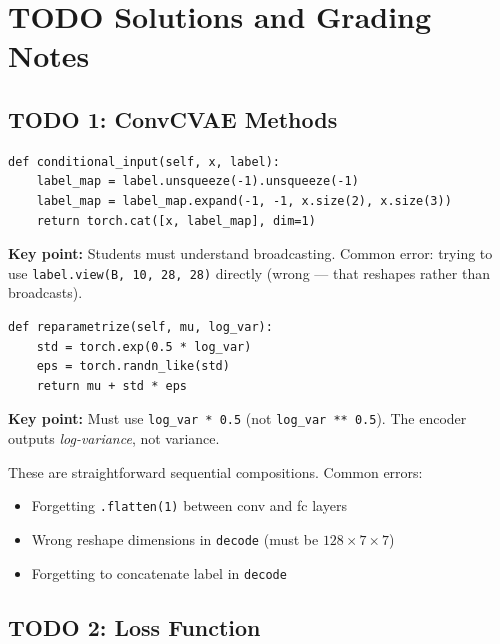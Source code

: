 \documentclass[11pt,a4paper]{article}
\begin{document}
\section{TODO Solutions and Grading Notes}

\subsection{TODO 1: ConvCVAE Methods}

\begin{correctbox}
\begin{verbatim}
def conditional_input(self, x, label):
    label_map = label.unsqueeze(-1).unsqueeze(-1)
    label_map = label_map.expand(-1, -1, x.size(2), x.size(3))
    return torch.cat([x, label_map], dim=1)
\end{verbatim}
\textbf{Key point:} Students must understand broadcasting. Common error: trying to use \texttt{label.view(B, 10, 28, 28)} directly (wrong --- that reshapes rather than broadcasts).
\end{correctbox}

\begin{correctbox}
\begin{verbatim}
def reparametrize(self, mu, log_var):
    std = torch.exp(0.5 * log_var)
    eps = torch.randn_like(std)
    return mu + std * eps
\end{verbatim}
\textbf{Key point:} Must use \texttt{log\_var * 0.5} (not \texttt{log\_var ** 0.5}). The encoder outputs \emph{log-variance}, not variance.
\end{correctbox}

\begin{correctbox}
These are straightforward sequential compositions. Common errors:
\begin{itemize}
    \item Forgetting \texttt{.flatten(1)} between conv and fc layers
    \item Wrong reshape dimensions in \texttt{decode} (must be $128 \times 7 \times 7$)
    \item Forgetting to concatenate label in \texttt{decode}
\end{itemize}
\end{correctbox}

\subsection{TODO 2: Loss Function}
\end{document}
